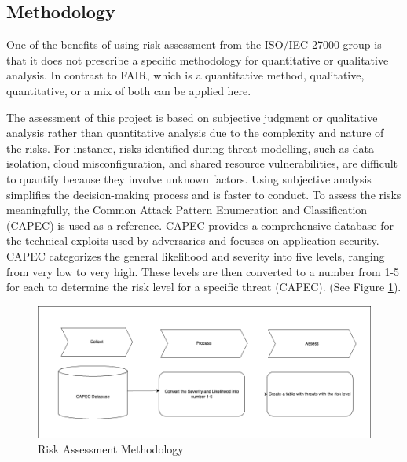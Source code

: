 \subsection{Methodology}
One of the benefits of using risk assessment from the ISO/IEC 27000 group is that it does not prescribe a specific methodology for quantitative or qualitative analysis. In contrast to FAIR, which is a quantitative method, qualitative, quantitative, or a mix of both can be applied here. 

The assessment of this project is based on subjective judgment or qualitative analysis rather than quantitative analysis due to the complexity and nature of the risks. For instance, risks identified during threat modelling, such as data isolation, cloud misconfiguration, and shared resource vulnerabilities, are difficult to quantify because they involve unknown factors. Using subjective analysis simplifies the decision-making process and is faster to conduct. To assess the risks meaningfully, the Common Attack Pattern Enumeration and Classification (CAPEC) is used as a reference. CAPEC provides a comprehensive database for the technical exploits used by adversaries and focuses on application security. CAPEC categorizes the general likelihood and severity into five levels, ranging from very low to very high. These levels are then converted to a number from 1-5 for each to determine the risk level for a specific threat (CAPEC). (See Figure \ref{fig:ris_assessment_method}). 

\begin{figure}[h!]
\centering
\includegraphics[width=\textwidth]{pics/risk_assessment_method.png}
\caption{Risk Assessment Methodology}\label{fig:ris_assessment_method}
\end{figure}

